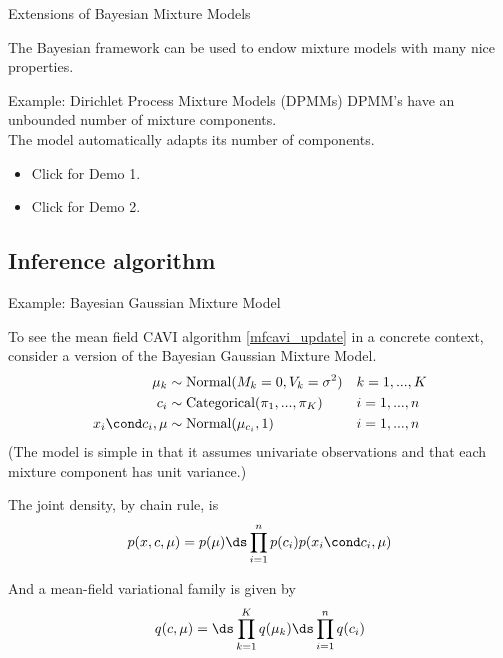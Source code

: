 \documentclass[10pt]{beamer}
\begin{document}
\begin{frame}{Extensions of Bayesian Mixture Models}

The Bayesian framework can be used to endow mixture models with many nice properties.
\vfill
{}
\begin{block}{Example: Dirichlet Process Mixture Models (DPMMs)}
DPMM's have an unbounded number of mixture components.   \\
\vfill
The model automatically adapts its number of components.

\begin{itemize}
\item Click  for Demo 1.
\item Click  for Demo 2.
\end{itemize}
\end{block}



\end{frame}


\subsection{Inference algorithm}
\begin{frame}{Example: Bayesian Gaussian Mixture Model}

To see the mean field CAVI algorithm \eqref{mfcavi_update} in a concrete context, consider a version of the Bayesian Gaussian Mixture Model.  
\begin{align*}
\mu_k & \sim \text{Normal}(M_k = 0, V_k = \sigma^2) && k = 1,..., K\\
c_i & \sim \text{Categorical}(\pi_1, ..., \pi_K) && i=1, ... ,n \\
x_i \cond c_i, \mu & \sim \text{Normal}(\mu_{c_i}, 1) && i = 1,..., n
\end{align*}
\tiny (The model is simple in that it assumes univariate observations and that each mixture component has unit variance.) \normalsize 

The joint density, by chain rule, is
\[ p(x,c,\mu) = p(\mu) \ds\prod_{i=1}^n p(c_i) p(x_i \cond c_i, \mu) \]

And a mean-field variational family is given by 
\[  q(c, \mu) = \ds\prod_{k=1}^K q(\mu_k) \ds\prod_{i=1}^n q(c_i) \]

\end{frame}
\end{document}
